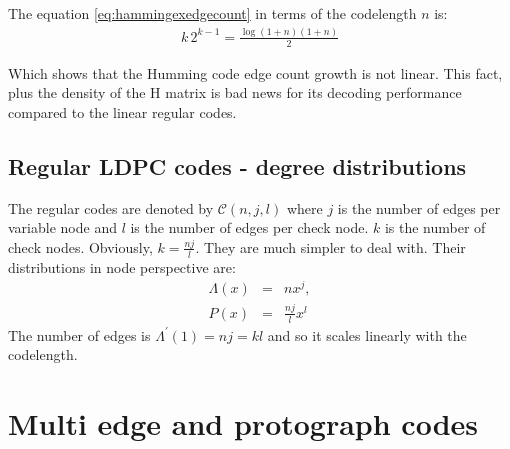 The equation \ref{eq:hammingexedgecount} in terms of the codelength $n$ is:
\begin{eqnarray}
k\,2^{k-1} = \frac{\log(1+n)(1+n)}{2}
\end{eqnarray}

Which shows that the Humming code edge count growth is not linear. This fact, plus the density of the H matrix is bad news for its decoding performance compared to the linear regular codes.




\subsection{Regular LDPC codes - degree distributions}
The regular codes are denoted by $\mathcal{C}(n, j, l)$ where $j$ is the number of edges per variable node and $l$ is the number of edges per check node. $k$ is the number of check nodes. Obviously, $k=\frac{nj}{l}$. They are much simpler to deal with.
Their distributions in node perspective are:
\begin{eqnarray}
\Lambda(x) &=& nx^j, \\
P(x) &=& \frac{nj}{l}x^{l}
\end{eqnarray}
The number of edges is $\Lambda^\prime(1) = nj = kl$ and so it scales linearly with the codelength.


\section{Multi edge and protograph codes}
\newpage
